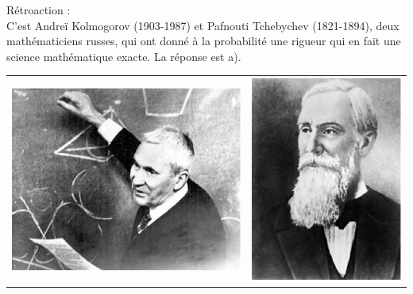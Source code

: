 \documentclass[letterpaper, 12pt]{article}
\begin{document}
R\'etroaction :\\
C'est Andre\"i Kolmogorov (1903-1987) et Pafnouti Tchebychev (1821-1894), deux math\'ematiciens russes, qui ont donn\'e \`a la probabilit\'e une rigueur qui en fait une science math\'ematique exacte. La r\'eponse est a).
\begin{center}
\begin{tabular}{c c}
\includegraphics[scale=0.35]{Kolmogorov.eps} & \includegraphics[scale=0.4]{Tchebychev.eps}\\

\end{tabular}
\end{center}
\end{document}
